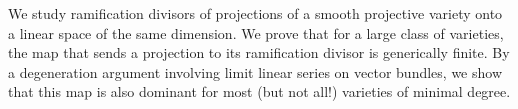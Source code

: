   We study ramification divisors of projections of a smooth projective variety onto a linear space of the same dimension.
  We prove that for a large class of varieties, the map that sends a projection to its ramification divisor is generically finite.
  By a degeneration argument involving limit linear series on vector bundles, we show that this map is also dominant for most (but not all!) varieties of minimal degree. 